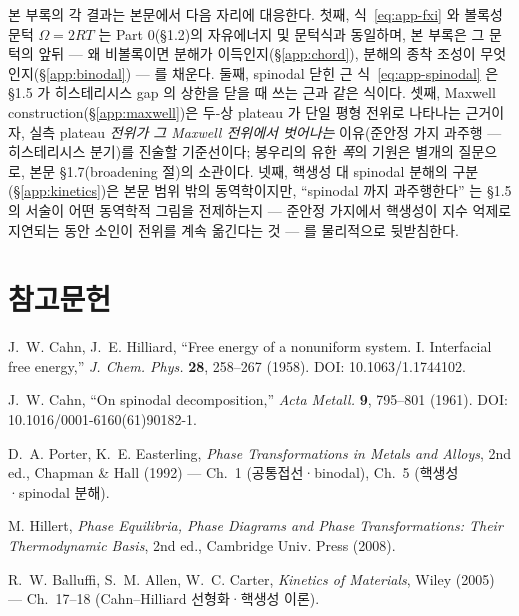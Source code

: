 \documentclass[11pt,a4paper]{article}
\begin{document}
본 부록의 각 결과는 본문에서 다음 자리에 대응한다. 첫째, 식~\eqref{eq:app-fxi} 와 볼록성 문턱
$\Omega=2RT$ 는 Part 0(\S1.2)의 자유에너지 및 문턱식과 동일하며, 본 부록은 그 문턱의 앞뒤 ---
왜 비볼록이면 분해가 이득인지(\S\ref{app:chord}), 분해의 종착 조성이 무엇인지(\S\ref{app:binodal})
--- 를 채운다. 둘째, spinodal 닫힌 근 식~\eqref{eq:app-spinodal} 은 \S1.5 가 히스테리시스 gap 의
상한을 닫을 때 쓰는 근과 같은 식이다. 셋째, Maxwell construction(\S\ref{app:maxwell})은 두-상
plateau 가 단일 평형 전위로 나타나는 근거이자, 실측 plateau \emph{전위가 그 Maxwell 전위에서
벗어나는} 이유(준안정 가지 과주행 --- 히스테리시스 분기)를 진술할 기준선이다; 봉우리의 유한
\emph{폭}의 기원은 별개의 질문으로, 본문 \S1.7(broadening 절)의 소관이다. 넷째, 핵생성 대 spinodal 분해의 구분(\S\ref{app:kinetics})은 본문
범위 밖의 동역학이지만, ``spinodal 까지 과주행한다'' 는 \S1.5 의 서술이 어떤 동역학적 그림을
전제하는지 --- 준안정 가지에서 핵생성이 지수 억제로 지연되는 동안 소인이 전위를 계속 옮긴다는 것 ---
를 물리적으로 뒷받침한다.

\section*{참고문헌}
\begin{enumerate}[label={[A\arabic*]},leftmargin=3.2em]
\item J.~W. Cahn, J.~E. Hilliard, ``Free energy of a nonuniform system. I. Interfacial free energy,''
\textit{J. Chem. Phys.} \textbf{28}, 258--267 (1958). DOI: 10.1063/1.1744102.
\item J.~W. Cahn, ``On spinodal decomposition,'' \textit{Acta Metall.} \textbf{9}, 795--801 (1961).
DOI: 10.1016/0001-6160(61)90182-1.
\item D.~A. Porter, K.~E. Easterling, \textit{Phase Transformations in Metals and Alloys}, 2nd ed.,
Chapman \& Hall (1992) --- Ch.~1 (공통접선·binodal), Ch.~5 (핵생성·spinodal 분해).
\item M. Hillert, \textit{Phase Equilibria, Phase Diagrams and Phase Transformations: Their
Thermodynamic Basis}, 2nd ed., Cambridge Univ. Press (2008).
\item R.~W. Balluffi, S.~M. Allen, W.~C. Carter, \textit{Kinetics of Materials}, Wiley (2005) ---
Ch.~17--18 (Cahn--Hilliard 선형화·핵생성 이론).
\end{enumerate}
\end{document}
